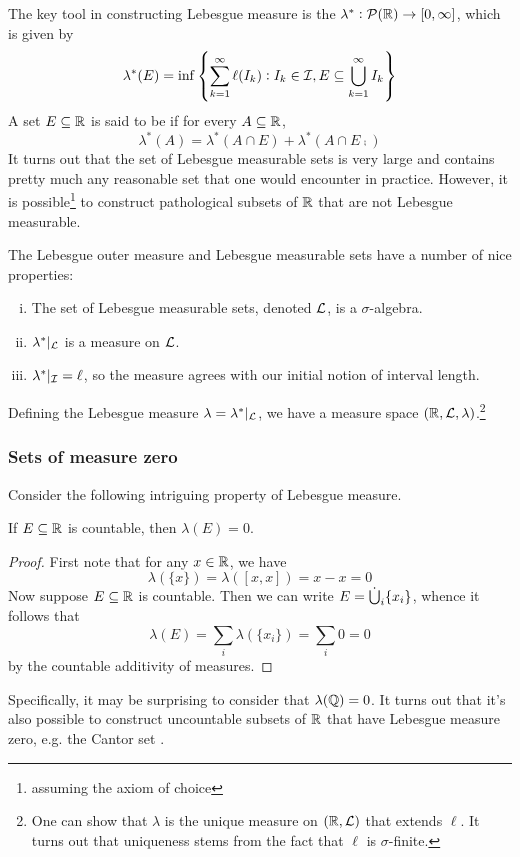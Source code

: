 \documentclass{article}
\begin{document}
The key tool in constructing Lebesgue measure is the  $\lambda^* : \mathcal{P}(\mathbb{R}) \to [0,\infty]$, which is given by
\[\lambda^*(E) = \inf\left\{\sum_{k=1}^\infty \ell(I_k) : I_k \in \mathcal{I}, E \subseteq \bigcup_{k=1}^\infty I_k\right\}\]
A set $E \subseteq \mathbb{R}$ is said to be  if for every $A \subseteq \mathbb{R}$,
\[\lambda^*(A) = \lambda^*(A \cap E) + \lambda^*(A \cap E\comp)\]
It turns out that the set of Lebesgue measurable sets is very large and contains pretty much any reasonable set that one would encounter in practice.
However, it is possible\footnote{
    assuming the axiom of choice
} to construct pathological subsets of $\mathbb{R}$ that are not Lebesgue measurable.

The Lebesgue outer measure and Lebesgue measurable sets have a number of nice properties:
\begin{enumerate}[(i)]
\item The set of Lebesgue measurable sets, denoted $\mathcal{L}$, is a $\sigma$-algebra.
\item $\lambda^*|_{\mathcal{L}}$ is a measure on $\mathcal{L}$.
\item $\lambda^*|_{\mathcal{I}} = \ell$, so the measure agrees with our initial notion of interval length.
\end{enumerate}
Defining the Lebesgue measure $\lambda = \lambda^*|_{\mathcal{L}}$, we have a measure space $(\mathbb{R}, \mathcal{L}, \lambda)$.\footnote{
    One can show that $\lambda$ is the unique measure on $(\mathbb{R}, \mathcal{L})$ that extends $\ell$.
    It turns out that uniqueness stems from the fact that $\ell$ is $\sigma$-finite.
}

\subsubsection{Sets of measure zero}
Consider the following intriguing property of Lebesgue measure.
\begin{proposition}
If $E \subseteq \mathbb{R}$ is countable, then $\lambda(E) = 0$.
\end{proposition}
\begin{proof}
First note that for any $x \in \mathbb{R}$, we have
\[\lambda(\{x\}) = \lambda([x,x]) = x - x = 0\]
Now suppose $E \subseteq \mathbb{R}$ is countable.
Then we can write $E = \mathop{\dot{\bigcup}}_i \{x_i\}$, whence it follows that
\[\lambda(E) = \sum_i \lambda(\{x_i\}) = \sum_i 0 = 0\]
by the countable additivity of measures.
\end{proof}
Specifically, it may be surprising to consider that $\lambda(\mathbb{Q}) = 0$.
It turns out that it's also possible to construct uncountable subsets of $\mathbb{R}$ that have Lebesgue measure zero, e.g. the Cantor set \cite{folland}.
\end{document}
